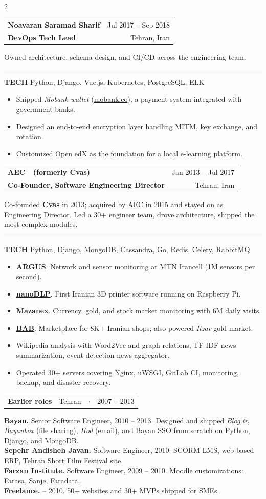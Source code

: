 \documentclass[10pt,letterpaper]{article}
\makeatletter
\newcommand{\so}[1]{#1}
\newcommand{\meta}[1]{{\color{muted}\fontsize{8.5}{10}\selectfont #1}}
\newcommand{\role}[4]{%
  \needspace{5\baselineskip}%
  \vspace{15pt}%
  \noindent\begin{tabular*}{\linewidth}{@{}l@{\extracolsep{\fill}}r@{}}
    {\color{accent}\bfseries\fontsize{12}{14}\selectfont #1} &
    {\color{muted}\fontsize{8.5}{10}\selectfont #4} \\[5pt]
    {\color{warm}\bfseries\fontsize{9.75}{11.5}\selectfont #2} &
    {\color{muted}\fontsize{8.5}{10}\selectfont #3} \\
  \end{tabular*}%
  \par\vspace{6pt}\nopagebreak%
}
\newcommand{\roleSimple}[2]{%
  \needspace{4\baselineskip}%
  \vspace{15pt}%
  \noindent\begin{tabular*}{\linewidth}{@{}l@{\extracolsep{\fill}}r@{}}
    {\color{accent}\bfseries\fontsize{12}{14}\selectfont #1} &
    {\color{muted}\fontsize{8.5}{10}\selectfont #2} \\
  \end{tabular*}%
  \par\vspace{6pt}\nopagebreak%
}
\newcommand{\techline}[1]{%
  \par\vspace{3pt}\noindent%
  \textcolor{c3}{\rule[-1pt]{2pt}{10pt}}\hspace{6pt}%
  {\color{c2}\bfseries\fontsize{8}{10}\selectfont\so{TECH}}\hspace{6pt}%
  {\color{ink2}\fontsize{8.5}{10}\selectfont #1}%
  \par\vspace{6pt}%
}
\makeatother
\begin{document}
\begin{paracol}{2}
\role{Noavaran Saramad Sharif}{DevOps Tech Lead}{Tehran, Iran}{Jul 2017 -- Sep 2018}
Owned architecture, schema design, and CI/CD across the engineering team.
\techline{Python, Django, Vue.js, Kubernetes, PostgreSQL, ELK}
\begin{itemize}
  \item Shipped \textit{Mobank wallet} (\href{http://mobank.co}{\color{c3}mobank.co}), a payment system integrated with government banks.
  \item Designed an end-to-end encryption layer handling MITM, key exchange, and rotation.
  \item Customized Open edX as the foundation for a local e-learning platform.
\end{itemize}

\role{AEC \, \,{\color{muted}\mdseries\fontsize{9}{11}\selectfont (formerly Cvas)}}{Co-Founder, Software Engineering Director}{Tehran, Iran}{Jan 2013 -- Jul 2017}
Co-founded \textbf{\color{accent}Cvas} in 2013; acquired by AEC in 2015 and stayed on as Engineering Director. Led a 30+ engineer team, drove architecture, shipped the most complex modules.
\techline{Python, Django, MongoDB, Cassandra, Go, Redis, Celery, RabbitMQ}
\begin{itemize}
  \item \href{http://www.argus-nms.com}{\color{c2}\textbf{ARGUS}}. Network and sensor monitoring at MTN Irancell (1M sensors per second).
  \item \href{https://www.nanodlp.com}{\color{c2}\textbf{nanoDLP}}. First Iranian 3D printer software running on Raspberry Pi.
  \item \href{http://mazanex.com}{\color{c2}\textbf{Mazanex}}. Currency, gold, and stock market monitoring with 6M daily visits.
  \item \href{http://bab.ir}{\color{c2}\textbf{BAB}}. Marketplace for 8K+ Iranian shops; also powered \textit{Itzar} gold market.
  \item Wikipedia analysis with Word2Vec and graph relations, TF-IDF news summarization, event-detection news aggregator.
  \item Operated 30+ servers covering Nginx, uWSGI, GitLab CI, monitoring, backup, and disaster recovery.
\end{itemize}

\roleSimple{Earlier roles}{Tehran \, \,$\cdot$\, \, 2007 -- 2013}
\vspace{2pt}
{\color{c2}\textbf{Bayan.}} \meta{Senior Software Engineer, 2010 -- 2013.} Designed and shipped \textit{Blog.ir}, \textit{Bayanbox} (file sharing), \textit{Hod} (email), and Bayan SSO from scratch on Python, Django, and MongoDB.\\[7pt]
{\color{c2}\textbf{Sepehr Andisheh Javan.}} \meta{Software Engineer, 2010.} SCORM LMS, web-based ERP, Tehran Short Film Festival site.\\[7pt]
{\color{c2}\textbf{Farzan Institute.}} \meta{Software Engineer, 2009 -- 2010.} Moodle customizations: Farasa, Sanje, Faradata.\\[7pt]
{\color{c2}\textbf{Freelance.}} \meta{2007 -- 2010.} 50+ websites and 30+ MVPs shipped for SMEs.

\end{paracol}
\end{document}
